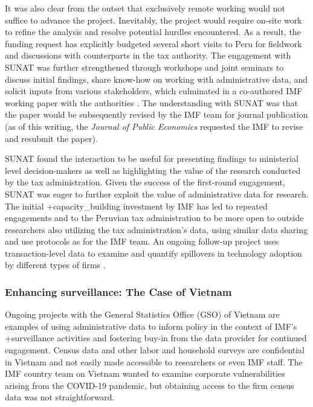 \documentclass[
]{book}
\begin{document}
It was also clear from the outset that exclusively remote working would not suffice to advance the project. Inevitably, the project would require on-site work to refine the analysis and resolve potential hurdles encountered. As a result, the funding request has explicitly budgeted several short visits to Peru for fieldwork and discussions with counterparts in the tax authority. The engagement with SUNAT was further strengthened through workshops and joint seminars to discuss initial findings, share know-how on working with administrative data, and solicit inputs from various stakeholders, which culminated in a co-authored IMF working paper with the authorities \citep{bellon2019}. The understanding with SUNAT was that the paper would be subsequently revised by the IMF team for journal publication (as of this writing, the \emph{Journal of Public Economics} requested the IMF to revise and resubmit the paper).

SUNAT found the interaction to be useful for presenting findings to ministerial level decision-makers as well as highlighting the value of the research conducted by the tax administration. Given the success of the first-round engagement, SUNAT was eager to further exploit the value of administrative data for research. The initial +capacity\_building\textbar{} investment by IMF has led to repeated engagements and to the Peruvian tax administration to be more open to outside researchers also utilizing the tax administration's data, using similar data sharing and use protocols as for the IMF team. An ongoing follow-up project uses transaction-level data to examine and quantify spillovers in technology adoption by different types of firms \citep{holtsmark2020}.

\hypertarget{enhancing-surveillance-the-case-of-vietnam}{%
\subsubsection{Enhancing surveillance: The Case of Vietnam}\label{enhancing-surveillance-the-case-of-vietnam}}

Ongoing projects with the General Statistics Office (GSO) of Vietnam are examples of using administrative data to inform policy in the context of IMF's +surveillance\textbar{} activities and fostering buy-in from the data provider for continued engagement. Census data and other labor and household surveys are confidential in Vietnam and not easily made accessible to researchers or even IMF staff. The IMF country team on Vietnam wanted to examine corporate vulnerabilities arising from the COVID-19 pandemic, but obtaining access to the firm census data was not straightforward.
\end{document}
